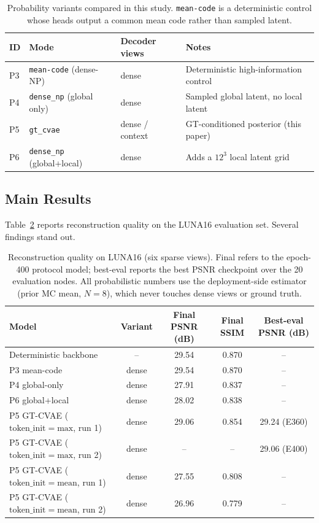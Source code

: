 \begin{table}[t]
\centering
\caption{Probability variants compared in this study. \texttt{mean-code}
is a deterministic control whose heads output a common mean code rather
than sampled latent.}
\label{tab:variance}
\begin{tabular}{@{}llll@{}}
\toprule
ID & Mode & Decoder views & Notes \\
\midrule
P3 & \texttt{mean-code} (dense-NP) & dense & Deterministic high-information control \\
P4 & \texttt{dense\_np} (global only) & dense & Sampled global latent, no local latent \\
P5 & \texttt{gt\_cvae} & dense / context & GT-conditioned posterior (this paper) \\
P6 & \texttt{dense\_np} (global+local) & dense & Adds a $12^3$ local latent grid \\
\bottomrule
\end{tabular}
\end{table}

\subsection{Main Results}
\label{sec:exp:main}

Table~\ref{tab:results} reports reconstruction quality on the LUNA16
evaluation set. Several findings stand out.

\begin{table}[t]
\centering
\caption{Reconstruction quality on LUNA16 (six sparse views). Final
refers to the epoch-400 protocol model; best-eval reports the best PSNR
checkpoint over the 20 evaluation nodes. All probabilistic numbers use
the deployment-side estimator (prior MC mean, $N{=}8$), which never
touches dense views or ground truth.}
\label{tab:results}
\begin{tabular}{@{}lcccc@{}}
\toprule
Model & Variant & Final PSNR (dB) & Final SSIM & Best-eval PSNR (dB) \\
\midrule
Deterministic backbone \cite{lin2024difgaussian} & -- & 29.54 & 0.870 & -- \\
P3 mean-code & dense & 29.54 & 0.870 & -- \\
\midrule
P4 global-only & dense & 27.91 & 0.837 & -- \\
P6 global+local & dense & 28.02 & 0.838 & -- \\
\midrule
P5 GT-CVAE ($\text{token\_init}{=}\mathrm{max}$, run 1) & dense & 29.06 & 0.854 & 29.24 (E360) \\
P5 GT-CVAE ($\text{token\_init}{=}\mathrm{max}$, run 2) & dense & -- & -- & 29.06 (E400) \\
P5 GT-CVAE ($\text{token\_init}{=}\mathrm{mean}$, run 1) & dense & 27.55 & 0.808 & -- \\
P5 GT-CVAE ($\text{token\_init}{=}\mathrm{mean}$, run 2) & dense & 26.96 & 0.779 & -- \\
\bottomrule
\end{tabular}
\end{table}

